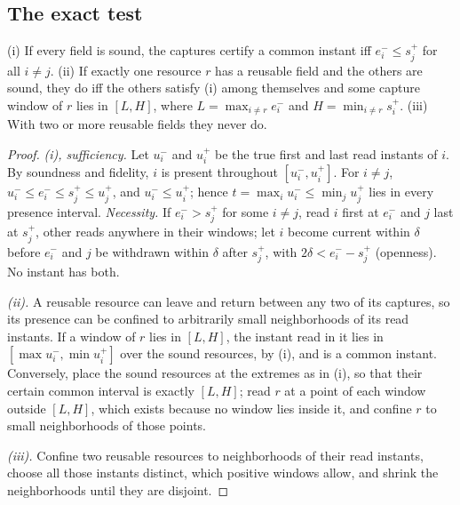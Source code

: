 \subsection{The exact test}
\begin{theorem}\label{thm:exact}
\textup{(i)} If every field is sound, the captures certify a common instant iff
$e_i^-\le s_j^+$ for all $i\ne j$. \textup{(ii)} If exactly one resource $r$
has a reusable field and the others are sound, they do iff the others satisfy
(i) among themselves and some capture window of $r$ lies in $[L,H]$, where
$L=\max_{i\ne r}e_i^-$ and $H=\min_{i\ne r}s_i^+$. \textup{(iii)} With two or
more reusable fields they never do.
\end{theorem}
\begin{proof}
\emph{(i), sufficiency.} Let $u_i^-$ and $u_i^+$ be the true first and last
read instants of $i$. By soundness and fidelity, $i$ is present throughout
$[u_i^-,u_i^+]$. For $i\ne j$, $u_i^-\le e_i^-\le s_j^+\le u_j^+$, and
$u_i^-\le u_i^+$; hence $t=\max_iu_i^-\le\min_ju_j^+$ lies in every presence
interval. \emph{Necessity.} If $e_i^->s_j^+$ for some $i\ne j$, read $i$ first
at $e_i^-$ and $j$ last at $s_j^+$, other reads anywhere in their windows; let
$i$ become current within $\delta$ before $e_i^-$ and $j$ be withdrawn within
$\delta$ after $s_j^+$, with $2\delta<e_i^--s_j^+$ (openness). No instant has
both.

\emph{(ii).} A reusable resource can leave and return between any two of its
captures, so its presence can be confined to arbitrarily small neighborhoods
of its read instants. If a window of $r$ lies in $[L,H]$, the instant read in
it lies in $[\max u_i^-,\min u_i^+]$ over the sound resources, by (i), and is a
common instant. Conversely, place the sound resources at the extremes as in
(i), so that their certain common interval is exactly $[L,H]$; read $r$ at a
point of each window outside $[L,H]$, which exists because no window lies
inside it, and confine $r$ to small neighborhoods of those points.

\emph{(iii).} Confine two reusable resources to neighborhoods of their read
instants, choose all those instants distinct, which positive windows allow,
and shrink the neighborhoods until they are disjoint.
\end{proof}

